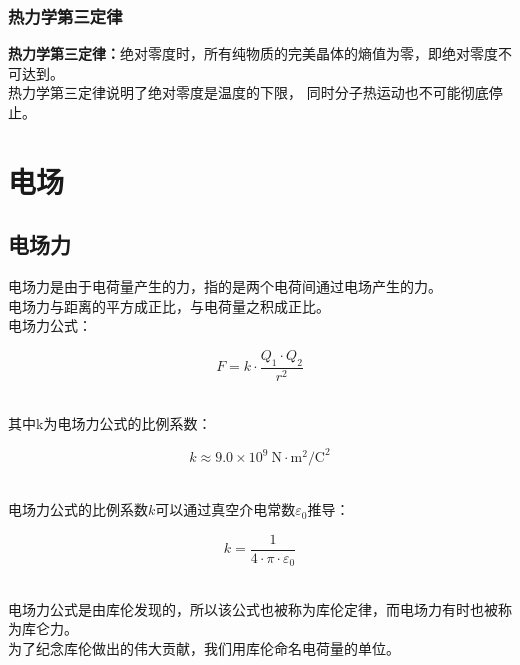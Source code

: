 \documentclass[UTF8]{ctexart}
\begin{document}
\subsubsection{热力学第三定律}
    \textbf{热力学第三定律：}绝对零度时，所有纯物质的完美晶体的熵值为零，即绝对零度不可达到。\\[3mm]
    热力学第三定律说明了绝对零度是温度的下限，
    同时分子热运动也不可能彻底停止。

\newpage

\section{电场}

\subsection{电场力}
    电场力是由于电荷量产生的力，指的是两个电荷间通过电场产生的力。\\[2mm]
    电场力与距离的平方成正比，与电荷量之积成正比。\\[4mm]
    电场力公式：
    \begin{large}
        \begin{equation*}
            F = k \cdot \frac{Q_{1} \cdot Q_{2}}{{r}^{2}}
        \end{equation*}
    \end{large}\\
    其中k为电场力公式的比例系数：
    \begin{large}
        \begin{equation*}
            k\approx 9.0\times 10^9~\text{N}\cdot\text{m}^2\text{/C}^2
        \end{equation*}
    \end{large}\\
    电场力公式的比例系数$k$可以通过真空介电常数$\varepsilon_0$推导：\vspace{5pt}
    \begin{large}
        \begin{equation*}
            k=\dfrac{1}{4\cdot\pi\cdot\varepsilon_0}
        \end{equation*}
    \end{large}\\
    电场力公式是由库伦发现的，所以该公式也被称为库伦定律，而电场力有时也被称为库仑力。\\[3mm]
    为了纪念库伦做出的伟大贡献，我们用库伦命名电荷量的单位。\\
\end{document}
